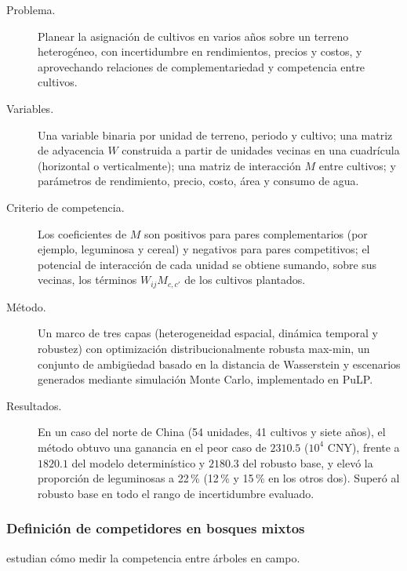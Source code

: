 \documentclass[11pt]{article}
\begin{document}
\begin{description}
  \item[Problema.] Planear la asignación de cultivos en varios años sobre un terreno heterogéneo, con incertidumbre en rendimientos, precios y costos, y aprovechando relaciones de complementariedad y competencia entre cultivos.
  \item[Variables.] Una variable binaria por unidad de terreno, periodo y cultivo; una matriz de adyacencia $W$ construida a partir de unidades vecinas en una cuadrícula (horizontal o verticalmente); una matriz de interacción $M$ entre cultivos; y parámetros de rendimiento, precio, costo, área y consumo de agua.
  \item[Criterio de competencia.] Los coeficientes de $M$ son positivos para pares complementarios (por ejemplo, leguminosa y cereal) y negativos para pares competitivos; el potencial de interacción de cada unidad se obtiene sumando, sobre sus vecinas, los términos $W_{ij}M_{c,c'}$ de los cultivos plantados.
  \item[Método.] Un marco de tres capas (heterogeneidad espacial, dinámica temporal y robustez) con optimización distribucionalmente robusta max-min, un conjunto de ambigüedad basado en la distancia de Wasserstein y escenarios generados mediante simulación Monte Carlo, implementado en PuLP.
  \item[Resultados.] En un caso del norte de China (54 unidades, 41 cultivos y siete años), el método obtuvo una ganancia en el peor caso de $2310.5$ ($10^{4}$ CNY), frente a $1820.1$ del modelo determinístico y $2180.3$ del robusto base, y elevó la proporción de leguminosas a 22\,\% (12\,\% y 15\,\% en los otros dos). Superó al robusto base en todo el rango de incertidumbre evaluado.
\end{description}

\subsubsection{Definición de competidores en bosques mixtos}

\textcite{kobal2025} estudian cómo medir la competencia entre árboles en campo.
\end{document}
